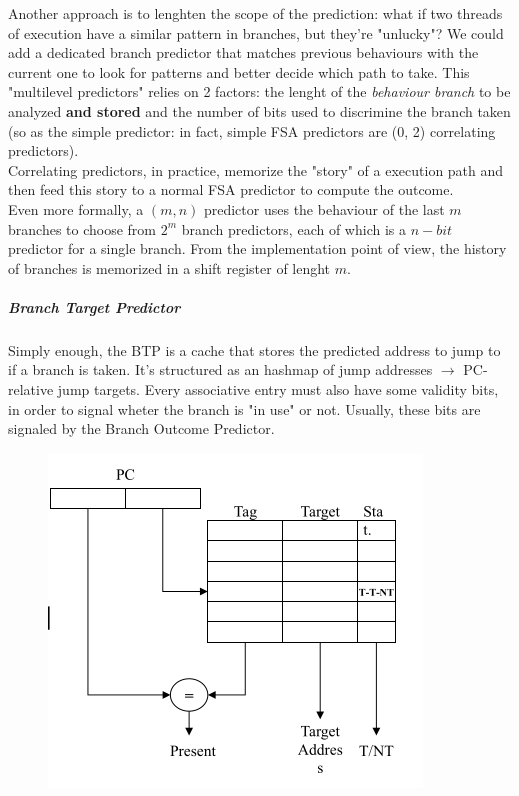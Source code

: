 \documentclass[10pt,a4paper]{article}
\begin{document}
							Another approach is to lenghten the scope of the prediction: what if two threads of execution have a similar pattern in branches, but they're "unlucky"? We could add a dedicated branch predictor that matches previous behaviours with the current one to look for patterns and better decide which path to take. This "multilevel predictors" relies on 2 factors: the lenght of the \emph{behaviour branch} to be analyzed \textbf{and stored} and the number of bits used to discrimine the branch taken (so as the simple predictor: in fact, simple FSA predictors are (0, 2) correlating predictors).\\
							Correlating predictors, in practice, memorize the "story" of a execution path and then feed this story to a normal FSA predictor to compute the outcome.\\
							Even more formally, a $(m, n)$ predictor uses the behaviour of the last $m$ branches to choose from $2^m$ branch predictors, each of which is a $n-bit$ predictor for a single branch. From the implementation point of view, the history of branches is memorized in a shift register of lenght $m$. 
						
						\subparagraph{Branch Target Predictor}
							Simply enough, the BTP is a cache that stores the predicted address to jump to if a branch is taken. It's structured as an hashmap of jump addresses $\rightarrow$ PC-relative jump targets. Every associative entry must also have some validity bits, in order to signal wheter the branch is "in use" or not. Usually, these bits are signaled by the Branch Outcome Predictor.
							\begin{figure}[H]
								\centering
								\includegraphics[width = \textwidth]{./images/BTP.png}
							\end{figure}
							
\end{document}
